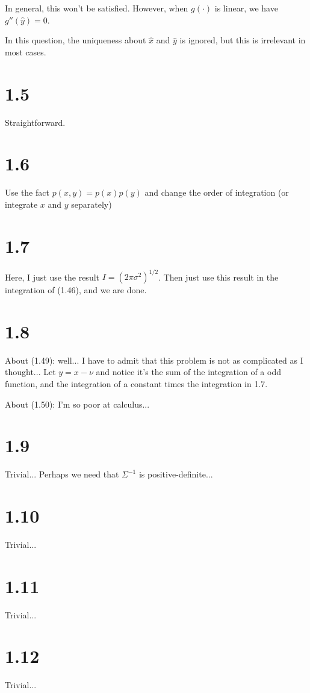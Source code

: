 \documentclass[12pt]{article}
\begin{document}
In general, this won't be satisfied. However, when $g(\cdot)$ is linear, we have $g''(\widehat{y})=0$.

In this question, the uniqueness about $\widehat{x}$ and $\widehat{y}$ is ignored, but this is irrelevant in most cases.

\section{1.5}
Straightforward.

\section{1.6}
Use the fact  $p(x,y) = p(x) p(y)$ and change the order of integration (or integrate $x$ and $y$ separately)

\section{1.7}
Here, I just use the result $I = {(2 \pi \sigma^2)}^{1/2}$. Then just use this result in the integration of (1.46), and we are done.

\section{1.8}
About (1.49): well... I have to admit that this problem is not as complicated as I thought... Let $y=x-\nu$ and notice it's the sum of the integration of a odd function, and the integration of a constant times the integration in 1.7.

About (1.50): I'm so poor at calculus...

\section{1.9}
Trivial... Perhaps we need that $\Sigma^{-1}$ is positive-definite...

\section{1.10}
Trivial... 

\section{1.11}
Trivial...

\section{1.12}
Trivial...
\end{document}
